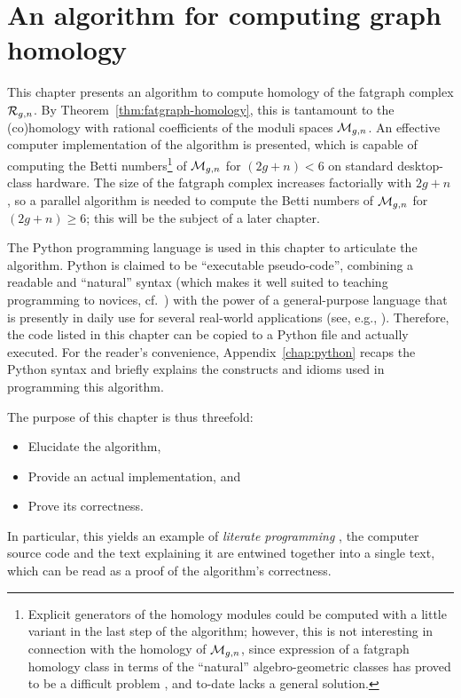 
\chapter[An algorithm for graph homology]
  {An algorithm for computing graph homology}
\label{chap:algorithm}

This chapter presents an algorithm to compute homology of the fatgraph
complex $\mathcal{R}_{g,n}$.  By Theorem~\ref{thm:fatgraph-homology}, this is
tantamount to the (co)homology with rational coefficients of the
moduli spaces $\mathcal{M}_{g,n}$. An effective computer implementation of the
algorithm is presented, which is capable of computing the Betti
numbers\footnote{Explicit generators of the homology modules could be
  computed with a little variant in the last step of the algorithm;
  however, this is not interesting in connection with the homology of
  $\mathcal{M}_{g,n}$, since expression of a fatgraph homology class in terms
  of the ``natural'' algebro-geometric classes has proved to be a
  difficult problem \cite{mondello:2004,
    igusa:combinatorial-miller-morita-mumford-classes-and-witten-cycles,
    igusa:graph-cohomology-and-kontsevich-cycles}, and to-date lacks a
  general solution.} of $\mathcal{M}_{g,n}$ for $(2g+n) < 6$ on standard
desktop-class hardware.  The size of the fatgraph complex increases
factorially with $2g+n$, so a parallel algorithm is needed to compute
the Betti numbers of $\mathcal{M}_{g,n}$ for $(2g+n) \geq 6$; this will be the
subject of a later chapter.

The Python programming language is used in this chapter to articulate
the algorithm.  Python is claimed to be ``executable pseudo-code'',
combining a readable and ``natural'' syntax (which makes it well suited
to teaching programming to novices, cf.~\cite{georgatos:python}) with the
power of a general-purpose language that is presently in daily use for
several real-world applications (see, e.g., \cite{python:success}).
Therefore, the code listed in this chapter can be copied to a Python
file and actually executed.  For the reader's convenience,
Appendix~\ref{chap:python} recaps the Python syntax and briefly explains the
constructs and idioms used in programming this algorithm.

The purpose of this chapter is thus threefold:
\begin{itemize}
\item Elucidate the algorithm,
\item Provide an actual implementation, and
\item Prove its correctness.
\end{itemize}
In particular, this yields an example of \emph{literate programming}
\cite{knuth:lp}, the computer source code and the text explaining it
are entwined together into a single text, which can be read as a proof
of the algorithm's correctness.

